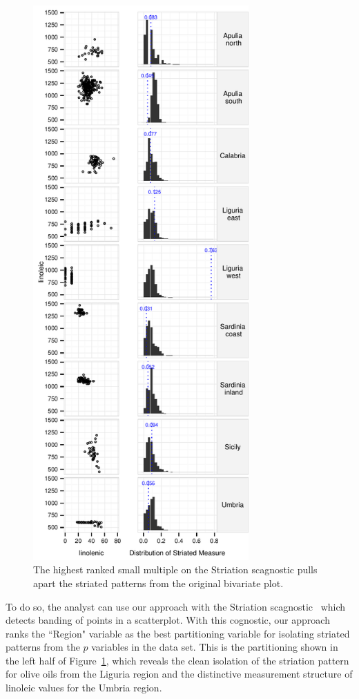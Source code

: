 \begin{figure}
	\includegraphics[width=3.25in]{images/15_729035813077-region.pdf}
	  \caption{The highest ranked small multiple on the Striation scagnostic pulls apart the striated patterns from the original bivariate plot. }
	 \label{fig:vrich_sm}
\end{figure}

To do so, the analyst can use our approach with the Striation scagnostic~\cite{Wilkinson2005} which detects banding of points in a scatterplot. With this cognostic, our approach ranks the ``Region" variable as the best partitioning variable for isolating striated patterns from the $p$ variables in the data set. This is the partitioning shown in the left half of Figure~\ref{fig:vrich_sm}, which reveals the clean isolation of the striation pattern for olive oils from the Liguria region and the distinctive measurement structure of linoleic values for the Umbria region.

